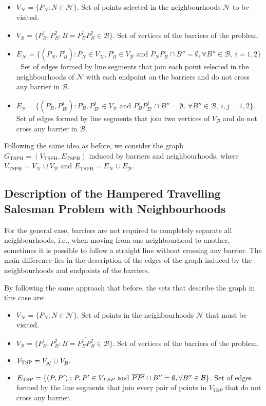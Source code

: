 \documentclass[a4paper,  review, authoryear, 1p., doubleblind]{elsarticle}
\newcommand{\TSPN}{{\sf{H-TSPN}\xspace }}
\newcommand{\B}{{\mathcal B}}
\newcommand{\VB}{{V^{}_{\mathcal B}}}
\newcommand{\EB}{{E^{}_{\mathcal B}}}
\newcommand{\VN}{{V^{}_{\mathcal N}}}
\newcommand{\EN}{{E^{}_{\mathcal N}}}
\newcommand{\GTSPH}{{G_{\text{TSPH}}}}
\newcommand{\VTSPH}{{V_{\text{TSPH}}}}
\newcommand{\ETSPH}{{E_{\text{TSPH}}}}
\begin{document}
	\begin{itemize}
		\item $\VN=\{P_N:N\in\mathcal N\}$. Set of points selected in the neighbourhoods $\mathcal N$ to be visited.
		\item $\VB=\{P^1_B, P^2_B:B=\overline{P^1_B P^2_B}\in \mathcal B\}$. Set of vertices of the barriers of the problem.
		\item $\EN=\{(P_N, P^i_{B}):P_N\in\VN, P^i_B\in V_\B\text{ and } \overline{P_NP^i_B}\cap B''=\emptyset,\forall B''\in\B,\:i=1,2\}$. Set of edges formed by line segments that join each point selected in the neighbourhoods of $\mathcal N$ with each endpoint on the barriers and do not cross any barrier in $\B$.
		\item $\EB=\{(P^{i}_B, P^{j}_{B'}):P^i_B, P^j_{B'}\in \VB \text{ and } \overline{P^i_B P^j_{B'}}\cap B''=\emptyset,\:\forall B''\in\mathcal B,\:i, j=1,2\}$. Set of edges formed by line segments that join two vertices of $V_{\mathcal B}$ and do not cross any barrier in $\B$.
	\end{itemize} 
	
	Following the same idea as before, we consider the graph $\GTSPH=(\VTSPH,\ETSPH)$ induced by barriers and neighbourhoods, where $\VTSPH=\VN\cup\VB$ and $\ETSPH=\EN\cup\EB$.
	
	
	\subsection{Description of the Hampered Travelling Salesman Problem with Neighbourhoods}
	For the general case, barriers are not required to completely separate all neighbourhoods, i.e., when moving from one neighbourhood to another, sometimes it is possible to follow a straight line without crossing any barrier. The main difference lies in the description of the edges of the graph induced by the neighbourhoods and endpoints of the barriers.
	
	By following the same approach that before, the sets that describe the graph in this case are:
	
	\begin{itemize}
		\item $\VN=\{P_N:N\in\mathcal N\}$. Set of points in the neighbourhoods $\mathcal N$ that must be visited.
		\item $\VB=\{P^1_B, P^2_B:B=\overline{P^1_B P^2_B}\in \mathcal B\}$. Set of vertices of the barriers of the problem.
		\item $V_{\rm TSP} = \VN \cup \VB$.
		\item $E_{\rm TSP}=\{(P, P'):P, P' \in V_{TSP} \text{ and } \overline{PP'}\cap B''=\emptyset,\forall B''\in\B\}$. Set of edges formed by the line segments that join every pair of points in $V_{TSP}$ that do not cross any barrier.
	\end{itemize} 
	
\end{document}
